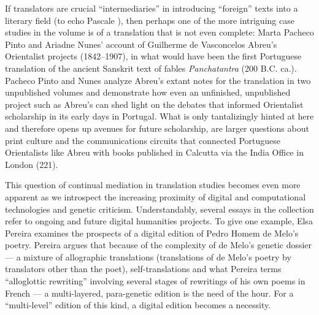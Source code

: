 \begin{review}
If translators are crucial ``intermediaries'' in introducing ``foreign''
texts into a literary field (to echo Pascale \citeauthor{casanova_world_2004}), then perhaps one
of the more intriguing case studies in the volume is of a translation
that is not even complete: Marta Pacheco Pinto and Ariadne Nunes'
account of Guilherme de Vasconcelos Abreu's Orientalist projects
(1842--1907), in what would have been the first Portuguese translation
of the ancient Sanskrit text of fables \emph{Panchatantra} (200 B.C.
ca.). Pacheco Pinto and Nunes analyze Abreu's extant notes for the
translation in two unpublished volumes and demonstrate how even an
unfinished, unpublished project such as Abreu's can shed light on the
debates that informed Orientalist scholarship in its early days in
Portugal. What is only tantalizingly hinted at here and therefore opens
up avenues for future scholarship, are larger questions about print
culture and the communications circuits that connected Portuguese
Orientalists like Abreu with books published in Calcutta via the India
Office in London (221).

This question of continual mediation in translation studies becomes even
more apparent as we introspect the increasing proximity of digital and
computational technologies and genetic criticism. Understandably,
several essays in the collection refer to ongoing and future digital
humanities projects. To give one example, Elsa Pereira examines the
prospects of a digital edition of Pedro Homem de Melo's poetry. Pereira
argues that because of the complexity of de Melo's genetic dossier –– a
mixture of allographic translations (translations of de Melo's poetry by
translators other than the poet), self-translations and what Pereira
terms ``alloglottic rewriting'' involving several stages of rewritings
of his own poems in French –– a multi-layered, para-genetic edition is
the need of the hour. For a ``multi-level'' edition of this kind, a
digital edition becomes a necessity.


\end{review}
